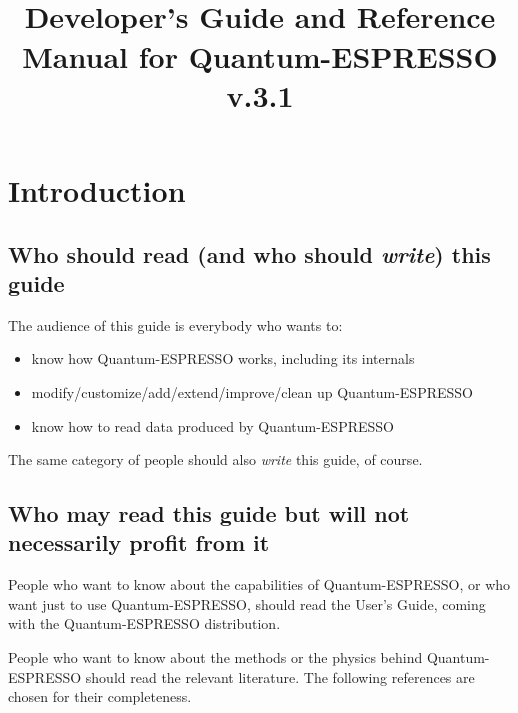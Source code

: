 \documentclass[12pt,a4paper]{article}
\def\version{3.1}
\begin{document}
 

\author{}
\date{}
\title{
  \hfill%
  \vspace{1.5cm}
  \\
  \huge Developer's Guide and Reference Manual for Quantum-ESPRESSO
       v.\version
}
\maketitle

\tableofcontents

\clearpage

\section{Introduction}

\subsection{Who should read (and who should {\em write}) this guide}

The audience of this guide is everybody who wants to:
\begin{itemize}
  \item know how Quantum-ESPRESSO works, including its internals
  \item modify/customize/add/extend/improve/clean up Quantum-ESPRESSO
  \item know how to read data produced by Quantum-ESPRESSO
\end{itemize}
The same category of people should also {\em write} this guide, of course.

\subsection{Who may read this guide but will not necessarily
profit from it}

People who want to know about the capabilities of Quantum-ESPRESSO,
or who want just to use Quantum-ESPRESSO, should read the User's Guide, 
coming with the Quantum-ESPRESSO distribution.

People who want to know about the methods or the physics
behind Quantum-ESPRESSO should read the relevant literature. The
following references are chosen for their completeness.
\end{document}

